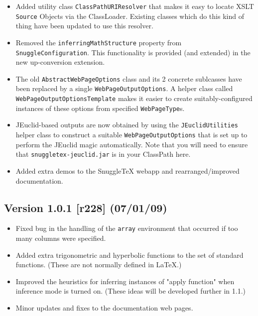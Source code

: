 \begin{itemize}
  \item Added utility class \verb|ClassPathURIResolver| that makes it easy to locate
    XSLT \verb|Source| Objects via the ClassLoader. Existing classes which do this kind of
    thing have been updated to use this resolver.

  \item Removed the \verb|inferringMathStructure| property from \verb|SnuggleConfiguration|.
    This functionality is provided (and extended) in the new up-conversion extension.

  \item The old \verb|AbstractWebPageOptions| class and its 2 concrete sublcasses have
    been replaced by a single \verb|WebPageOutputOptions|. A helper class called
    \verb|WebPageOutputOptionsTemplate| makes it easier to create suitably-configured
    instances of these options from specified \verb|WebPageType|s.

  \item JEuclid-based outputs are now obtained by using the \verb|JEuclidUtilities|
    helper class to construct a suitable \verb|WebPageOutputOptions| that is set up
    to perform the JEuclid magic automatically. Note that you will need to ensure that
    \verb|snuggletex-jeuclid.jar| is in your ClassPath here.

  \item Added extra demos to the SnuggleTeX webapp and rearranged/improved documentation.

\end{itemize}

\subsection*{Version 1.0.1 [r228] (07/01/09)}

\begin{itemize}

  \item Fixed bug in the handling of the \verb|array| environment that occurred
  if too many columns were specified.

  \item Added extra trigonometric and hyperbolic functions to the set of standard
  functions. (These are not normally defined in LaTeX.)

  \item Improved the heuristics for inferring instances of "apply function" when
  inference mode is turned on. (These ideas will be developed further in 1.1.)

  \item Minor updates and fixes to the documentation web pages.

\end{itemize}

